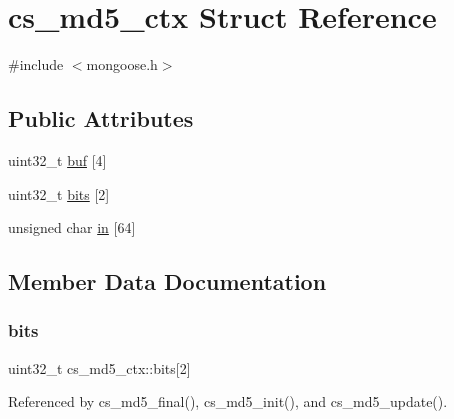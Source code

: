 \hypertarget{structcs__md5__ctx}{}\section{cs\+\_\+md5\+\_\+ctx Struct Reference}
\label{structcs__md5__ctx}


{\ttfamily \#include $<$mongoose.\+h$>$}

\subsection*{Public Attributes}
\begin{DoxyCompactItemize}
\item 
uint32\+\_\+t \hyperlink{structcs__md5__ctx_abb0fb32f33a62efcd9dc65e3f76cf790_abb0fb32f33a62efcd9dc65e3f76cf790}{buf} \mbox{[}4\mbox{]}
\item 
uint32\+\_\+t \hyperlink{structcs__md5__ctx_a598348fc328298a1d8d0ac673d69f749_a598348fc328298a1d8d0ac673d69f749}{bits} \mbox{[}2\mbox{]}
\item 
unsigned char \hyperlink{structcs__md5__ctx_a950ebb13dee2724d8d60d9d558d1757d_a950ebb13dee2724d8d60d9d558d1757d}{in} \mbox{[}64\mbox{]}
\end{DoxyCompactItemize}


\subsection{Member Data Documentation}
\mbox{\label{structcs__md5__ctx_a598348fc328298a1d8d0ac673d69f749_a598348fc328298a1d8d0ac673d69f749}} 
\subsubsection{\texorpdfstring{bits}{bits}}
{\footnotesize\ttfamily uint32\+\_\+t cs\+\_\+md5\+\_\+ctx\+::bits\mbox{[}2\mbox{]}}



Referenced by cs\+\_\+md5\+\_\+final(), cs\+\_\+md5\+\_\+init(), and cs\+\_\+md5\+\_\+update().

\mbox{\label{structcs__md5__ctx_abb0fb32f33a62efcd9dc65e3f76cf790_abb0fb32f33a62efcd9dc65e3f76cf790}} 
